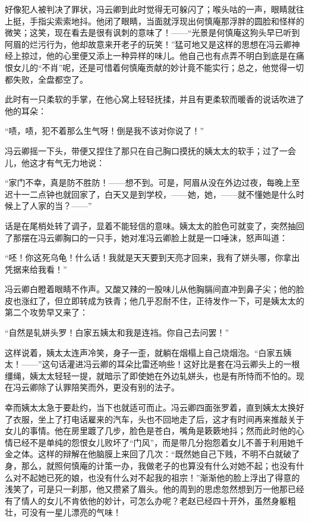 \par 好像犯人被判决了罪状，冯云卿到此时觉得无可躲闪了；喉头咕的一声，眼睛就往上挺，手指尖索索地抖。他闭了眼睛，当面就浮现出何慎庵那浮胖的圆脸和怪样的微笑；这笑，现在看去是很有讽刺的意味了！——“光景是何慎庵这狗头早已听到阿眉的烂污行为，他却故意来开老子的玩笑！”猛可地又是这样的思想在冯云卿神经上掠过，他的心里便又添上一种异样的味儿。他自己也有点弄不明白到底是在痛恨女儿的“不肖”呢，还是可惜着何慎庵贡献的妙计竟不能实行；总之，他觉得一切都失败，全盘都空了。
\par 此时有一只柔软的手掌，在他心窝上轻轻抚揉，并且有更柔软而暖香的说话吹进了他的耳朵：
\par “啧，啧，犯不着那么生气呀！倒是我不该对你说了！”
\par 冯云卿摇一下头，带便又捏住了那只在自己胸口摸抚的姨太太的软手；过了一会儿，他这才有气无力地说：
\par “家门不幸，真是防不胜防！——想不到。可是，阿眉从没在外边过夜，每晚上至迟十一二点钟也就回家了，白天又是到学校，——她，她，——就不懂她是什么时候上了人家的当？——”
\par 话是在尾梢处转了调子，显着不能轻信的意味。姨太太的脸色可就变了，突然抽回了那摆在冯云卿胸口的一只手，她对准冯云卿脸上就是一口唾沫，怒声叫道：
\par “呸！你这死乌龟！什么话！我就是天天要到天亮才回来，我有了姘头哪，你拿出凭据来给我看！”
\par 冯云卿白瞪着眼睛不作声。又酸又辣的一股味儿从他胸膈间直冲到鼻子尖；他的脸皮也涨红了，但立即转成为铁青；他几乎忍耐不住，正待发作一下，可是姨太太的第二个攻势早又来了：
\par “自然是轧姘头罗！白家五姨太和我是连裆。你自己去问罢！”
\par 这样说着，姨太太连声冷笑，身子一歪，就躺在烟榻上自己烧烟泡。“白家五姨太！——”这句话灌进冯云卿的耳朵比雷还响些！这好比是套在冯云卿头上的一根缰绳，姨太太轻轻一提，就暗示了即使她在外边轧姘头，也是有所恃而不怕的。现在冯云卿除了认罪陪笑而外，更没有别的法子。
\par 幸而姨太太急于要赴约，当下也就适可而止。冯云卿四面张罗着，直到姨太太换好了衣服，坐上了打电话雇来的汽车，头也不回地走了后，这才有时间再来推敲关于女儿的事情。他在房里踱了几步，脸色是苍白，嘴角是簌簌地抖；然而此时他的心情已经不是单纯的怨恨女儿败坏了“门风”，而是带几分抱怨着女儿不善于利用她千金之体。这样的辩解在他脑膜上来回了几次：“既然她自己下贱，不明不白就破了身，那么，就照何慎庵的计策一办，我做老子的也算没有什么对她不起；也没有什么对不起她已死的娘，也没有什么对不起我的祖宗！”渐渐他的脸上浮出了得意的浅笑了，可是只一刹那，他又攒紧了眉头。他的周到的思虑忽然想到万一他那已经有了情人的女儿不肯依他的妙计，可怎么办呢？老赵已经四十开外，虽然身躯粗壮，可没有一星儿漂亮的气味！
